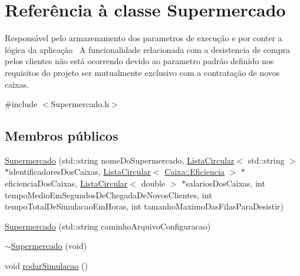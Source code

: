 \hypertarget{class_supermercado}{\section{Referência à classe Supermercado}
\label{class_supermercado}
}


Responsável pelo armazenamento dos parametros de execução e por conter a lógica da aplicação~\newline
 A funcionalidade relacionada com a desistencia de compra pelos clientes não está ocorrendo devido ao parametro padrão definido nos requisitos do projeto ser mutualmente exclusivo com a contratação de novos caixas.  




{\ttfamily \#include $<$Supermercado.\+h$>$}

\subsection*{Membros públicos}
\begin{DoxyCompactItemize}
\item 
\hyperlink{class_supermercado_a51e46aa12924a52dbf0e4f26ad3bd7b3}{Supermercado} (std\+::string nome\+Do\+Supermercado, \hyperlink{class_lista_circular}{Lista\+Circular}$<$ std\+::string $>$ $\ast$identificadores\+Dos\+Caixas, \hyperlink{class_lista_circular}{Lista\+Circular}$<$ \hyperlink{class_caixa_a0e98d0cd8dc2ff4f73d637d73f7bbe85}{Caixa\+::\+Eficiencia} $>$ $\ast$eficiencia\+Dos\+Caixas, \hyperlink{class_lista_circular}{Lista\+Circular}$<$ double $>$ $\ast$salarios\+Dos\+Caixas, int tempo\+Medio\+Em\+Segundos\+De\+Chegada\+De\+Novos\+Clientes, int tempo\+Total\+De\+Simulacao\+Em\+Horas, int tamanho\+Maximo\+Das\+Filas\+Para\+Desistir)
\item 
\hyperlink{class_supermercado_a3f0598a98bd6179c4553eb213c4aa48c}{Supermercado} (std\+::string caminho\+Arquivo\+Configuracao)
\item 
\hyperlink{class_supermercado_ab21737ada65202c6293a503bfa64e8a0}{$\sim$\+Supermercado} (void)
\item 
void \hyperlink{class_supermercado_a2244eb3e925e1e5e78a0d152bbaa78a9}{rodar\+Simulacao} ()
\end{DoxyCompactItemize}


